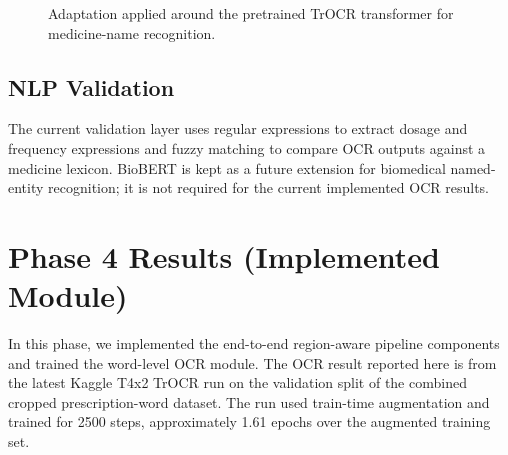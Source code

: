 \documentclass[twocolumn,10pt]{article}
\begin{document}
\begin{figure}[t]
\centering
{}
\caption{Adaptation applied around the pretrained TrOCR transformer for medicine-name recognition.}
\label{fig:trocr-adaptation}
\end{figure}

\subsection{NLP Validation}
The current validation layer uses regular expressions to extract dosage and frequency expressions and fuzzy matching to compare OCR outputs against a medicine lexicon. BioBERT is kept as a future extension for biomedical named-entity recognition; it is not required for the current implemented OCR results.

\section{Phase 4 Results (Implemented Module)}
In this phase, we implemented the end-to-end region-aware pipeline components and trained the word-level OCR module. The OCR result reported here is from the latest Kaggle T4x2 TrOCR run on the validation split of the combined cropped prescription-word dataset. The run used train-time augmentation and trained for 2500 steps, approximately 1.61 epochs over the augmented training set.
\end{document}
